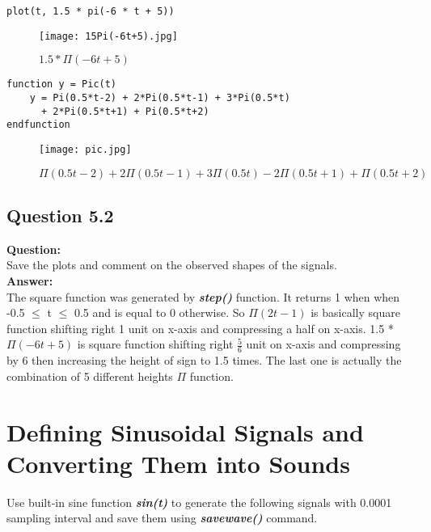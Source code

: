 \documentclass[12pt,fleqn]{article}
\begin{document}
\begin{lstlisting}[frame=single]
plot(t, 1.5 * pi(-6 * t + 5))
\end{lstlisting}
\begin{figure}[H]
\centering
\texttt{[image: 15Pi(-6t+5).jpg]}
\caption{$1.5*\Pi(-6t+5)$}
\end{figure}

\begin{lstlisting}[frame=single]
function y = Pic(t)
    y = Pi(0.5*t-2) + 2*Pi(0.5*t-1) + 3*Pi(0.5*t) 
      + 2*Pi(0.5*t+1) + Pi(0.5*t+2)
endfunction
\end{lstlisting}
\begin{figure}[H]
\centering
\texttt{[image: pic.jpg]}
\caption{$\Pi(0.5t-2)+2\Pi(0.5t-1)+3\Pi(0.5t)-2\Pi(0.5t+1)+\Pi(0.5t+2)$}
\end{figure}

\subsection{Question 5.2}
\textbf{Question:}\\
Save the plots and comment on the observed shapes of the signals.\\
\textbf{Answer:}\\
The square function was generated by \emph{\textbf{step()}} function. It returns 1 when when -0.5 $\leq$ t $\leq$ 0.5 and is equal to 0 otherwise. So $\Pi(2t-1)$ is basically square function shifting right 1 unit on x-axis and compressing a half on x-axis. 1.5 * $\Pi(-6t+5)$ is square function shifting right $\frac{5}{6}$ unit on x-axis and compressing by 6 then increasing the height of sign to 1.5 times. The last one is actually the combination of 5 different heights $\Pi$ function. 

\section{Defining Sinusoidal Signals and Converting Them into Sounds}
Use built-in sine function \emph{\textbf{sin(t)}} to generate the following signals with 0.0001 sampling interval and save them using \emph{\textbf{savewave()}} command.
\end{document}

